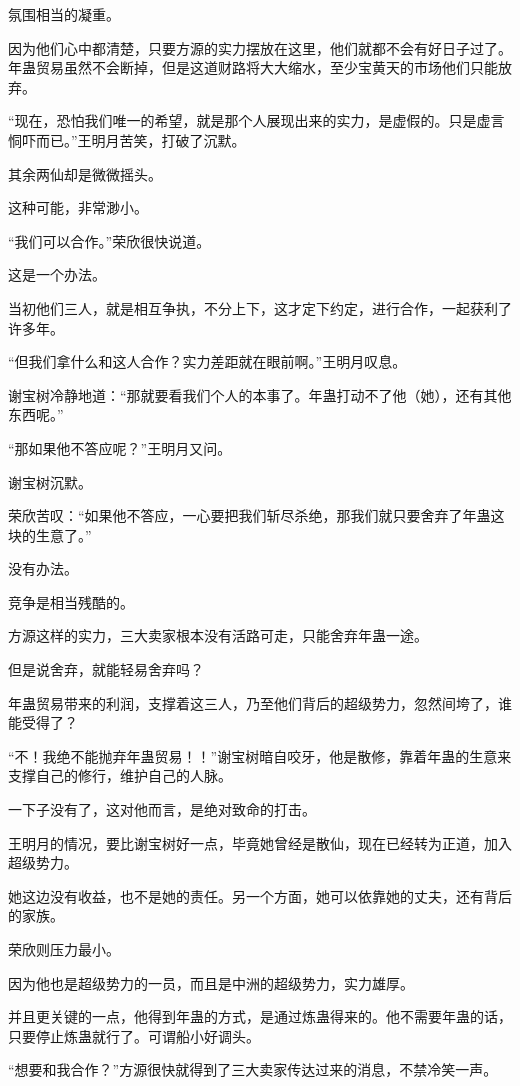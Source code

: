 \begin{this_body}
氛围相当的凝重。

因为他们心中都清楚，只要方源的实力摆放在这里，他们就都不会有好日子过了。年蛊贸易虽然不会断掉，但是这道财路将大大缩水，至少宝黄天的市场他们只能放弃。

“现在，恐怕我们唯一的希望，就是那个人展现出来的实力，是虚假的。只是虚言恫吓而已。”王明月苦笑，打破了沉默。

其余两仙却是微微摇头。

这种可能，非常渺小。

“我们可以合作。”荣欣很快说道。

这是一个办法。

当初他们三人，就是相互争执，不分上下，这才定下约定，进行合作，一起获利了许多年。

“但我们拿什么和这人合作？实力差距就在眼前啊。”王明月叹息。

谢宝树冷静地道：“那就要看我们个人的本事了。年蛊打动不了他（她），还有其他东西呢。”

“那如果他不答应呢？”王明月又问。

谢宝树沉默。

荣欣苦叹：“如果他不答应，一心要把我们斩尽杀绝，那我们就只要舍弃了年蛊这块的生意了。”

没有办法。

竞争是相当残酷的。

方源这样的实力，三大卖家根本没有活路可走，只能舍弃年蛊一途。

但是说舍弃，就能轻易舍弃吗？

年蛊贸易带来的利润，支撑着这三人，乃至他们背后的超级势力，忽然间垮了，谁能受得了？

“不！我绝不能抛弃年蛊贸易！！”谢宝树暗自咬牙，他是散修，靠着年蛊的生意来支撑自己的修行，维护自己的人脉。

一下子没有了，这对他而言，是绝对致命的打击。

王明月的情况，要比谢宝树好一点，毕竟她曾经是散仙，现在已经转为正道，加入超级势力。

她这边没有收益，也不是她的责任。另一个方面，她可以依靠她的丈夫，还有背后的家族。

荣欣则压力最小。

因为他也是超级势力的一员，而且是中洲的超级势力，实力雄厚。

并且更关键的一点，他得到年蛊的方式，是通过炼蛊得来的。他不需要年蛊的话，只要停止炼蛊就行了。可谓船小好调头。

“想要和我合作？”方源很快就得到了三大卖家传达过来的消息，不禁冷笑一声。


\end{this_body}
